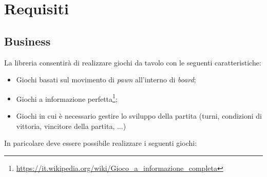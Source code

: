 \section{Requisiti}




\subsection{Business}

La libreria consentirà di realizzare giochi da tavolo con le seguenti caratteristiche:

\begin{itemize}
    \item Giochi basati sul movimento di \textit{pawn} all'interno di \textit{board};
    \item Giochi a informazione perfetta\footnote{\url{https://it.wikipedia.org/wiki/Gioco_a_informazione_completa}};
    \item Giochi in cui è necessario gestire lo sviluppo della partita (turni, condizioni di vittoria, vincitore della partita, ...)
\end{itemize}

In paricolare deve essere possibile realizzare i seguenti giochi:

